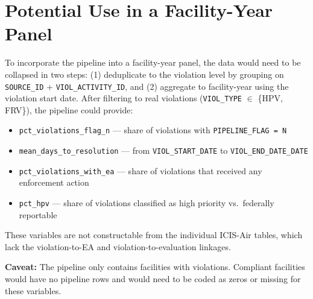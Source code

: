 \documentclass[11pt]{article}
\begin{document}
\section{Potential Use in a Facility-Year Panel}

To incorporate the pipeline into a facility-year panel, the data would need to be collapsed in two steps: (1) deduplicate to the violation level by grouping on \texttt{SOURCE\_ID} + \texttt{VIOL\_ACTIVITY\_ID}, and (2) aggregate to facility-year using the violation start date. After filtering to real violations (\texttt{VIOL\_TYPE} $\in$ \{HPV, FRV\}), the pipeline could provide:

\begin{itemize}[nosep]
  \item \texttt{pct\_violations\_flag\_n} --- share of violations with \texttt{PIPELINE\_FLAG = N}
  \item \texttt{mean\_days\_to\_resolution} --- from \texttt{VIOL\_START\_DATE} to \texttt{VIOL\_END\_DATE\_DATE}
  \item \texttt{pct\_violations\_with\_ea} --- share of violations that received any enforcement action
  \item \texttt{pct\_hpv} --- share of violations classified as high priority vs.\ federally reportable
\end{itemize}

\noindent These variables are not constructable from the individual ICIS-Air tables, which lack the violation-to-EA and violation-to-evaluation linkages.

\textbf{Caveat:} The pipeline only contains facilities with violations. Compliant facilities would have no pipeline rows and would need to be coded as zeros or missing for these variables.
\end{document}
